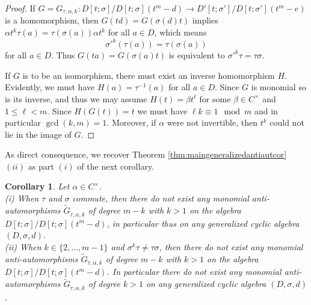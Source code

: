 \documentclass{amsart}
\theoremstyle{plain}
\newtheorem{corollary}[theorem]{Corollary}
\theoremstyle{definition}
\numberwithin{equation}{section}
\numberwithin{figure}{section}
\begin{document}
\begin{proof}
    If $G=G_{\tau,\alpha,k}:D[t;\sigma]/D[t;\sigma](t^m-d)\to D'[t;\sigma']/D[t;\sigma'](t^m-e)$ is a homomorphism, then $G(td)=G(\sigma(d)t)$ implies $\alpha t^k \tau(a) = \tau(\sigma(a)) \alpha t^k$ for all $a\in D$, which means
$$
{\sigma'}^k(\tau(a)) = \tau(\sigma(a))
$$
for all $a\in D$.  Thus $G(ta)=G(\sigma(a)t)$ is equivalent to ${\sigma'}^k\tau = \tau\sigma$.

If $G$ is to be an isomorphism, there must exist an inverse homomorphism $H$.
Evidently, we must have $H(a)=\tau^{-1}(a)$ for all $a\in D$.  Since $G$ is monomial so is its inverse, and thus we may assume $H(t)=\beta t^\ell$ for some $\beta \in C^\times$ and $1\leq \ell < m$.  Since $H(G(t))=t$ we must have $\ell k \equiv 1 \mod m$ and in particular $\gcd(k,m)=1$.
Moreover, if $\alpha$ were not invertible, then $t^k$ could not lie in the image of $G$.
\end{proof}

As direct consequence, we recover Theorem \ref{thm:maingeneralizedantiautcor} $(ii)$ as part $(i)$ of the next corollary.

\begin{corollary}
Let $\alpha \in C^\times$.
\\ (i) When $\tau$ and $\sigma$  commute, then there do not exist any  monomial anti-automorphisms $\widetilde G_{\tilde \tau,\alpha,k}$ of degree $m-k$ with $k>1$  on the algebra $D[t;\sigma]/D[t;\sigma](t^m-d)$, in particular thus on any generalized cyclic algebra $(D,\sigma,d)$.
\\ (ii) When $k\in \{2,\dots, m-1 \}$ and $\sigma^k\tau \not= \tau\sigma$, then there do not exist any  monomial anti-automorphisms $\widetilde G_{\tilde\tau,\alpha,k}$ of degree $m-k$ with $k>1$ on the algebra $D[t;\sigma]/D[t;\sigma](t^m-d)$. In particular there do not exist any  monomial anti-automorphisms $\widetilde G_{\tilde\tau,\alpha,k}$ of degree $k>1$  on any generalized cyclic algebra $(D,\sigma,d)$.
\end{corollary}
\end{document}
